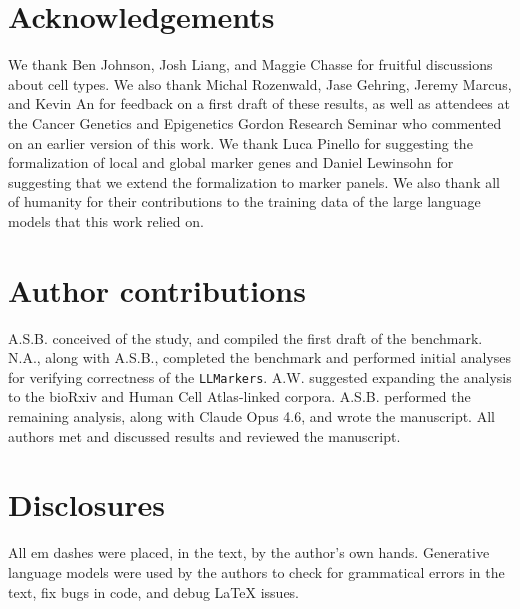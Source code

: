 \documentclass[10pt,twocolumn]{article}
\theoremstyle{plain}
\theoremstyle{definition}
\theoremstyle{remark}
\begin{document}
\section{Acknowledgements}
We thank Ben Johnson, Josh Liang, and Maggie Chasse for fruitful discussions about cell types. We also thank Michal Rozenwald, Jase Gehring, Jeremy Marcus, and Kevin An for feedback on a first draft of these results, as well as attendees at the Cancer Genetics and Epigenetics Gordon Research Seminar who commented on an earlier version of this work. We thank Luca Pinello for suggesting the formalization of local and global marker genes and Daniel Lewinsohn for suggesting that we extend the formalization to marker panels. We also thank all of humanity for their contributions to the training data of the large language models that this work relied on.

\section{Author contributions}
A.S.B. conceived of the study, and compiled the first draft of the benchmark. N.A., along with A.S.B., completed the benchmark and performed initial analyses for verifying correctness of the \texttt{LLMarkers}. A.W. suggested expanding the analysis to the bioRxiv and Human Cell Atlas-linked corpora. A.S.B. performed the remaining analysis, along with Claude Opus 4.6, and wrote the manuscript. All authors met and discussed results and reviewed the manuscript.

\section{Disclosures}
All em dashes were placed, in the text, by the author's own hands. Generative language models were used by the authors to check for grammatical errors in the text, fix bugs in code, and debug \LaTeX{} issues.

\newpage
\printclaimsources


\end{document}
